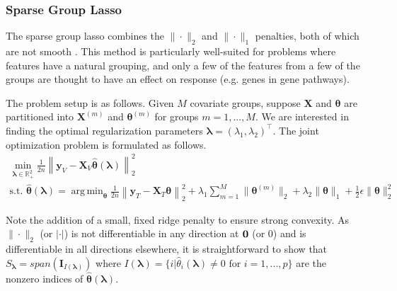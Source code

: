 \documentclass[12pt,letterpaper]{article}
\DeclareMathOperator*{\argmin}{arg\,min}
\begin{document}
\subsubsection{Sparse Group Lasso}\label{sec:sgl}

The sparse group lasso combines the $\|\cdot\|_2$ and $\|\cdot\|_1$ penalties, both of which are not smooth \citep{simon2013sparse}. This method is particularly well-suited for problems where features have a natural grouping, and only a few of the features from a few of the groups are thought to have an effect on response (e.g. genes in gene pathways).

The problem setup is as follows. Given $M$ covariate groups, suppose $\boldsymbol{X}$ and $\boldsymbol \theta$ are partitioned into $\boldsymbol{X}^{(m)}$ and $\boldsymbol \theta^{(m)}$ for groups $m = 1, ... , M$. We are interested in finding the optimal regularization parameters $\boldsymbol{\lambda} = (\lambda_1, \lambda_2)^\top$. The joint optimization problem is formulated as follows.
\begin{equation}
\begin{array}{c}
\min_{\boldsymbol{\lambda} \in \mathbb{R}^2_{+}} \frac{1}{2n}
\left \| \boldsymbol{y}_V - \boldsymbol{X}_V \hat{\boldsymbol{\theta}}(\boldsymbol{\lambda}) \right \|^2_2 \\
\text{s.t. }
\hat{\boldsymbol{\theta}}(\boldsymbol{\lambda}) =
\argmin_{\boldsymbol{\theta}} \frac{1}{2n} 
\left \| \boldsymbol{y}_T - \boldsymbol{X}_T \boldsymbol{\theta} \right \|^2_2
+ \lambda_1 \sum_{m=1}^M \| \boldsymbol\theta^{(m)} \|_2
+ \lambda_2 \| \boldsymbol\theta \|_1
+ \frac{1}{2} \epsilon \| \boldsymbol\theta \|_2^2
\end{array}
\end{equation}

Note the addition of a small, fixed ridge penalty to ensure strong convexity. As $\|\cdot\|_2$ (or $|\cdot|$) is not differentiable in any direction at ${\bf 0}$ (or $0$) and is differentiable in all directions elsewhere, it is straightforward to show that $S_{\boldsymbol \lambda} = span(\boldsymbol I_{I(\boldsymbol\lambda)})$ where $I(\boldsymbol\lambda) = \{i | \hat{\theta}_i(\boldsymbol\lambda) \ne 0 \text{ for } i=1,...,p \}$ are the nonzero indices of $\hat{\boldsymbol{\theta}}(\boldsymbol{\lambda})$.
\end{document}
